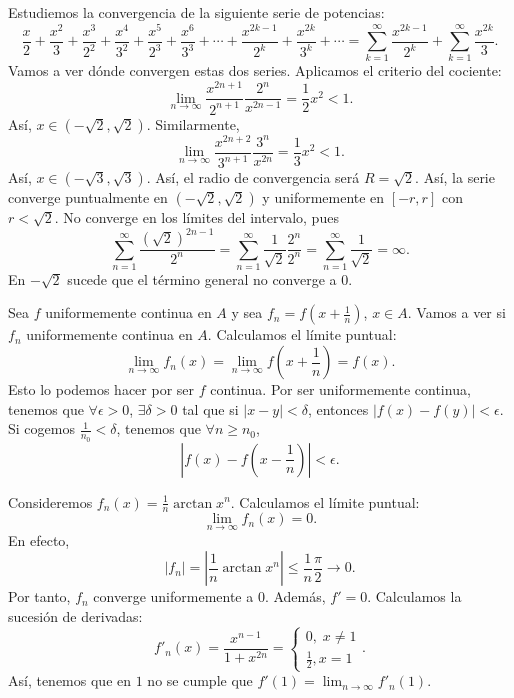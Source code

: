 \begin{eg}
\normalfont Estudiemos la convergencia de la siguiente serie de potencias:
\[\frac{x}{2} + \frac{x^{2}}{3} + \frac{x^{3}}{2^{2}} + \frac{x^{4}}{3^{2}} + \frac{x^{5}}{2^{3}}+\frac{x^{6}}{3^{3}} + \cdots + \frac{x^{2k-1}}{2^{k}} + \frac{x^{2k}}{3^{k}} + \cdots = \sum^{\infty}_{k = 1} \frac{x^{2k-1}}{2^{k}} + \sum^{\infty}_{k = 1}\frac{x^{2k}}{3} .\]
Vamos a ver dónde convergen estas dos series. Aplicamos el criterio del cociente:
\[\lim_{n \to \infty}\frac{x^{2n+1}}{2^{n+1}} \frac{2^{n}}{x^{2n-1}} = \frac{1}{2}x^{2} < 1 .\]
Así, $\displaystyle x \in \left(-\sqrt{2}, \sqrt{2}\right) $. Similarmente, 
\[\lim_{n \to \infty}\frac{x^{2n+2}}{3^{n+1}}\frac{3^{n}}{x^{2n}} = \frac{1}{3}x^{2} < 1 .\]
Así, $\displaystyle x \in \left(-\sqrt{3}, \sqrt{3}\right) $. Así, el radio de convergencia será $\displaystyle R = \sqrt{2} $. Así, la serie converge puntualmente en $\displaystyle \left(-\sqrt{2}, \sqrt{2}\right) $ y uniformemente en $\displaystyle \left[-r,r\right]  $ con $\displaystyle r < \sqrt{2} $. No converge en los límites del intervalo, pues
\[ \sum^{\infty}_{n = 1}\frac{\left(\sqrt{2}\right)^{2n-1}}{2^{n}} = \sum^{\infty}_{n = 1}\frac{1}{\sqrt{2}}\frac{2^{n}}{2^{n}} = \sum^{\infty}_{n = 1}\frac{1}{\sqrt{2}} = \infty .\]
En $\displaystyle -\sqrt{2} $ sucede que el término general no converge a 0.
\end{eg}
\begin{eg}
\normalfont Sea $\displaystyle f $ uniformemente continua en $\displaystyle A $ y sea $\displaystyle f_{n} = f\left(x + \frac{1}{n}\right) $, $\displaystyle x \in A $. Vamos a ver si $\displaystyle f_{n} $ uniformemente continua en $\displaystyle A $. Calculamos el límite puntual:
\[\lim_{n \to \infty}f_{n}\left(x\right) = \lim_{n \to \infty} f\left(x + \frac{1}{n}\right) = f\left(x\right) .\]
Esto lo podemos hacer por ser $\displaystyle f $ continua. Por ser uniformemente continua, tenemos que $\displaystyle \forall \epsilon > 0 $, $\displaystyle \exists \delta > 0 $ tal que si $\displaystyle \left|x-y\right|<\delta  $, entonces $\displaystyle \left|f\left(x\right)-f\left(y\right)\right|<\epsilon  $. Si cogemos $\displaystyle \frac{1}{n_{0}} < \delta  $, tenemos que $\displaystyle \forall n \geq n_{0} $,  
\[ \left|f\left(x\right)-f\left(x-\frac{1}{n}\right)\right| <\epsilon   .\]
\end{eg}
\begin{eg}
\normalfont Consideremos $\displaystyle f_{n}\left(x\right) = \frac{1}{n}\arctan x^{n} $. Calculamos el límite puntual:
\[\lim_{n \to \infty}f_{n}\left(x\right) = 0.\]
En efecto, 
\[ \left|f_{n}\right| = \left|\frac{1}{n}\arctan x^{n}\right| \leq \frac{1}{n}\frac{\pi }{2} \to 0 .\]
Por tanto, $\displaystyle f_{n} $ converge uniformemente a 0. Además, $\displaystyle f' = 0 $. Calculamos la sucesión de derivadas:
\[f'_{n}\left(x\right) = \frac{x^{n-1}}{1 + x^{2n}} =
\begin{cases}
0, \; x \neq 1 \\
\frac{1}{2}, x = 1
\end{cases}
.\]
Así, tenemos que en $\displaystyle 1 $ no se cumple que $\displaystyle f'\left(1\right) = \lim_{n \to \infty}f'_{n}\left(1\right) $.
\end{eg}
